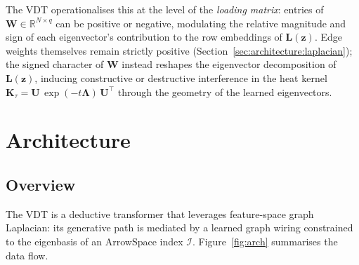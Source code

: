 \documentclass[11pt,a4paper]{article}
\newcommand{\Lmat}{\mathbf{L}}
\newcommand{\Umat}{\mathbf{U}}
\newcommand{\Wmat}{\mathbf{W}}
\newcommand{\R}{\mathbb{R}}
\newcommand{\T}{^{\intercal}}
\begin{document}
The VDT operationalises this at the level of the \emph{loading matrix}:
entries of $\Wmat \in \R^{N \times q}$ can be positive or negative,
modulating the relative magnitude and sign of each eigenvector's contribution
to the row embeddings of $\Lmat(\mathbf{z})$.  Edge weights themselves remain
strictly positive (Section~\ref{sec:architecture:laplacian}); the signed
character of $\Wmat$ instead reshapes the eigenvector decomposition of
$\Lmat(\mathbf{z})$, inducing constructive or destructive interference in the
heat kernel $\mathbf{K}_\tau = \Umat\,\exp(-t\boldsymbol{\Lambda})\,\Umat\T$
through the geometry of the learned eigenvectors.

\section{Architecture}
\label{sec:architecture}

\subsection{Overview}
\label{sec:architecture:overview}

The VDT is a deductive transformer that leverages feature-space graph Laplacian:
its generative path is mediated by a learned graph wiring constrained to the
eigenbasis of an ArrowSpace index $\mathcal{I}$.
Figure~\ref{fig:arch} summarises the data flow.
\end{document}
